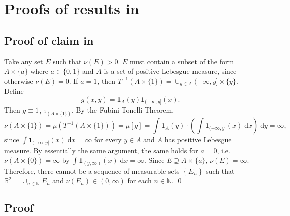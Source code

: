 
\section{Proofs of results in \texorpdfstring{}{Section
\ref{sec--intro}}}

\subsection{Proof of claim in
\texorpdfstring{}{Example
\ref{eg--non-sigma-finite-pushforward}}}
\label{sec--prf--eg--non-sigma-finite-pushforward}

Take any set \(E\) such that \(\nu (E) > 0\).
\(E\) must contain a subset of the form \(A \times \{a\}\) where \(a \in \{0,
1\}\) and \(A\) is a set of positive Lebesgue measure, since otherwise
\(\nu (E) = 0\).
If \(a = 1\), then \(T^{- 1} (A \times \{1\}) = \cup_{y \in A} (- \infty, y]
\times \{y\}\).
Define
\begin{equation*}
  g (x, y) = \mathbf{1}_{A} (y) \mathbf{1}_{(- \infty, y]} (x).
\end{equation*}
Then \(g \equiv 1_{T^{- 1} (A \times \{1\})}\).
By the Fubini-Tonelli Theorem,
\begin{equation*}
  \nu (A \times \{1\}) = \mu (T^{- 1} (A \times \{1\})) = \mu \left[ g \right] =
  \int \mathbf{1}_{A} (y) \cdot \left( \int \mathbf{1}_{(- \infty, y]} (x) \;
  \mathrm{d} x \right) \; \mathrm{d} y = \infty,
\end{equation*}
since \(\int \mathbf{1}_{(- \infty, y]} (x) \; \mathrm{d} x = \infty\) for every
\(y \in A\) and \(A\) has positive Lebesgue measure.
By essentially the same argument, the same holds for \(a = 0\), i.e.
\(\nu (A \times \{0\}) = \infty\) by \(\int \mathbf{1}_{(y, \infty)} (x) \;
\mathrm{d} x = \infty\).
Since \(E \supseteq A \times \{a\}\), \(\nu (E) = \infty\).
Therefore, there cannot be a sequence of measurable sets \(\left\{ E_{n}
\right\}\) such that \(\mathbb{R}^{2} = \cup_{n \in \mathbb{N}} E_{n}\) and
\(\nu \left( E_{n} \right) \in (0, \infty)\) for each \(n
\in \mathbb{N}\).
\qed

\subsection{Proof
\texorpdfstring{}{Theorem
\ref{thm--sigma-finite-meas-abs-bicont-prob-meas}}}
\label{sec--prf--thm--sigma-finite-meas-abs-bicont-prob-meas}

